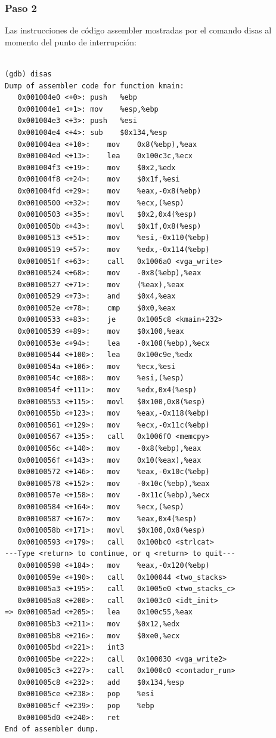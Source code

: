 \documentclass[a4paper]{article}
\begin{document}
\subsubsection*{Paso 2} 
\begin{list}{•}
\item Las instrucciones de código assembler mostradas por el comando disas al momento del punto de interrupción:

\begin{lstlisting}

(gdb) disas
Dump of assembler code for function kmain:
   0x001004e0 <+0>:	push   %ebp
   0x001004e1 <+1>:	mov    %esp,%ebp
   0x001004e3 <+3>:	push   %esi
   0x001004e4 <+4>:	sub    $0x134,%esp
   0x001004ea <+10>:	mov    0x8(%ebp),%eax
   0x001004ed <+13>:	lea    0x100c3c,%ecx
   0x001004f3 <+19>:	mov    $0x2,%edx
   0x001004f8 <+24>:	mov    $0x1f,%esi
   0x001004fd <+29>:	mov    %eax,-0x8(%ebp)
   0x00100500 <+32>:	mov    %ecx,(%esp)
   0x00100503 <+35>:	movl   $0x2,0x4(%esp)
   0x0010050b <+43>:	movl   $0x1f,0x8(%esp)
   0x00100513 <+51>:	mov    %esi,-0x110(%ebp)
   0x00100519 <+57>:	mov    %edx,-0x114(%ebp)
   0x0010051f <+63>:	call   0x1006a0 <vga_write>
   0x00100524 <+68>:	mov    -0x8(%ebp),%eax
   0x00100527 <+71>:	mov    (%eax),%eax
   0x00100529 <+73>:	and    $0x4,%eax
   0x0010052e <+78>:	cmp    $0x0,%eax
   0x00100533 <+83>:	je     0x1005c8 <kmain+232>
   0x00100539 <+89>:	mov    $0x100,%eax
   0x0010053e <+94>:	lea    -0x108(%ebp),%ecx
   0x00100544 <+100>:	lea    0x100c9e,%edx
   0x0010054a <+106>:	mov    %ecx,%esi
   0x0010054c <+108>:	mov    %esi,(%esp)
   0x0010054f <+111>:	mov    %edx,0x4(%esp)
   0x00100553 <+115>:	movl   $0x100,0x8(%esp)
   0x0010055b <+123>:	mov    %eax,-0x118(%ebp)
   0x00100561 <+129>:	mov    %ecx,-0x11c(%ebp)
   0x00100567 <+135>:	call   0x1006f0 <memcpy>
   0x0010056c <+140>:	mov    -0x8(%ebp),%eax
   0x0010056f <+143>:	mov    0x10(%eax),%eax
   0x00100572 <+146>:	mov    %eax,-0x10c(%ebp)
   0x00100578 <+152>:	mov    -0x10c(%ebp),%eax
   0x0010057e <+158>:	mov    -0x11c(%ebp),%ecx
   0x00100584 <+164>:	mov    %ecx,(%esp)
   0x00100587 <+167>:	mov    %eax,0x4(%esp)
   0x0010058b <+171>:	movl   $0x100,0x8(%esp)
   0x00100593 <+179>:	call   0x100bc0 <strlcat>
---Type <return> to continue, or q <return> to quit---
   0x00100598 <+184>:	mov    %eax,-0x120(%ebp)
   0x0010059e <+190>:	call   0x100044 <two_stacks>
   0x001005a3 <+195>:	call   0x1005e0 <two_stacks_c>
   0x001005a8 <+200>:	call   0x1003c0 <idt_init>
=> 0x001005ad <+205>:	lea    0x100c55,%eax
   0x001005b3 <+211>:	mov    $0x12,%edx
   0x001005b8 <+216>:	mov    $0xe0,%ecx
   0x001005bd <+221>:	int3   
   0x001005be <+222>:	call   0x100030 <vga_write2>
   0x001005c3 <+227>:	call   0x1000c0 <contador_run>
   0x001005c8 <+232>:	add    $0x134,%esp
   0x001005ce <+238>:	pop    %esi
   0x001005cf <+239>:	pop    %ebp
   0x001005d0 <+240>:	ret    
End of assembler dump.


\end{lstlisting}
\end{list}
\end{document}
